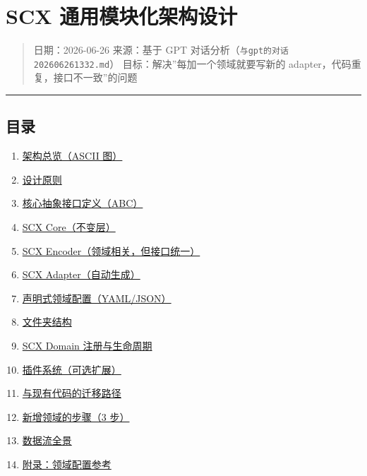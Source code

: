 \documentclass[
  12pt,
]{ctexart}
\author{SCX}
\date{2026}
\providecommand{\tightlist}{%
  \setlength{\itemsep}{0pt}\setlength{\parskip}{0pt}}
\begin{document}
\section{SCX
通用模块化架构设计}\label{scx-ux901aux7528ux6a21ux5757ux5316ux67b6ux6784ux8bbeux8ba1}

\begin{quote}
日期：2026-06-26 来源：基于 GPT
对话分析（\texttt{与gpt的对话202606261332.md}）
目标：解决''每加一个领域就要写新的 adapter，代码重复，接口不一致''的问题
\end{quote}

\begin{center}\rule{0.5\linewidth}{0.5pt}\end{center}

\subsection{目录}\label{ux76eeux5f55}

\begin{enumerate}
\def\labelenumi{\arabic{enumi}.}
\tightlist
\item
  \hyperref[1-ux67b6ux6784ux603bux89c8]{架构总览（ASCII 图）}
\item
  \hyperref[2-ux8bbeux8ba1ux539fux5219]{设计原则}
\item
  \hyperref[3-ux6838ux5fc3ux62bdux8c61ux63a5ux53e3ux5b9aux4e49]{核心抽象接口定义（ABC）}
\item
  \hyperref[4-scx-core-ux4e0dux53d8ux5c42]{SCX Core（不变层）}
\item
  \hyperref[5-scx-encoder-ux9886ux57dfux76f8ux5173ux4f46ux63a5ux53e3ux7edfux4e00]{SCX
  Encoder（领域相关，但接口统一）}
\item
  \hyperref[6-scx-adapter-ux81eaux52a8ux751fux6210]{SCX
  Adapter（自动生成）}
\item
  \hyperref[7-ux58f0ux660eux5f0fux9886ux57dfux914dux7f6e]{声明式领域配置（YAML/JSON）}
\item
  \hyperref[8-ux6587ux4ef6ux5939ux7ed3ux6784]{文件夹结构}
\item
  \hyperref[9-scx-domain-ux6ce8ux518cux4e0eux751fux547dux5468ux671f]{SCX
  Domain 注册与生命周期}
\item
  \hyperref[10-ux63d2ux4ef6ux7cfbux7edf]{插件系统（可选扩展）}
\item
  \hyperref[11-ux4e0eux73b0ux6709ux4ee3ux7801ux7684ux8fc1ux79fbux8defux5f84]{与现有代码的迁移路径}
\item
  \hyperref[12-ux65b0ux589eux9886ux57dfux7684ux6b65ux9aa4]{新增领域的步骤（3
  步）}
\item
  \hyperref[13-ux6570ux636eux6d41ux5168ux666f]{数据流全景}
\item
  \hyperref[14-ux9644ux5f55]{附录：领域配置参考}
\end{enumerate}
\end{document}
